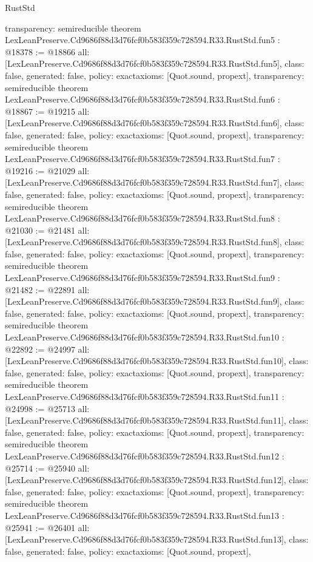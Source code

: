\begin{lexlean}{RustStd}
\begin{coremodule}
{  transparency: semireducible
}
theorem LexLeanPreserve.Cd9686f88d3d76fcf0b583f359c728594.R33.RustStd.fun5 : @18378 := @18866 {
  all: [LexLeanPreserve.Cd9686f88d3d76fcf0b583f359c728594.R33.RustStd.fun5],
  class: false,
  generated: false,
  policy: exact{axioms: [Quot.sound, propext]},
  transparency: semireducible
}
theorem LexLeanPreserve.Cd9686f88d3d76fcf0b583f359c728594.R33.RustStd.fun6 : @18867 := @19215 {
  all: [LexLeanPreserve.Cd9686f88d3d76fcf0b583f359c728594.R33.RustStd.fun6],
  class: false,
  generated: false,
  policy: exact{axioms: [Quot.sound, propext]},
  transparency: semireducible
}
theorem LexLeanPreserve.Cd9686f88d3d76fcf0b583f359c728594.R33.RustStd.fun7 : @19216 := @21029 {
  all: [LexLeanPreserve.Cd9686f88d3d76fcf0b583f359c728594.R33.RustStd.fun7],
  class: false,
  generated: false,
  policy: exact{axioms: [Quot.sound, propext]},
  transparency: semireducible
}
theorem LexLeanPreserve.Cd9686f88d3d76fcf0b583f359c728594.R33.RustStd.fun8 : @21030 := @21481 {
  all: [LexLeanPreserve.Cd9686f88d3d76fcf0b583f359c728594.R33.RustStd.fun8],
  class: false,
  generated: false,
  policy: exact{axioms: [Quot.sound, propext]},
  transparency: semireducible
}
theorem LexLeanPreserve.Cd9686f88d3d76fcf0b583f359c728594.R33.RustStd.fun9 : @21482 := @22891 {
  all: [LexLeanPreserve.Cd9686f88d3d76fcf0b583f359c728594.R33.RustStd.fun9],
  class: false,
  generated: false,
  policy: exact{axioms: [Quot.sound, propext]},
  transparency: semireducible
}
theorem LexLeanPreserve.Cd9686f88d3d76fcf0b583f359c728594.R33.RustStd.fun10 : @22892 := @24997 {
  all: [LexLeanPreserve.Cd9686f88d3d76fcf0b583f359c728594.R33.RustStd.fun10],
  class: false,
  generated: false,
  policy: exact{axioms: [Quot.sound, propext]},
  transparency: semireducible
}
theorem LexLeanPreserve.Cd9686f88d3d76fcf0b583f359c728594.R33.RustStd.fun11 : @24998 := @25713 {
  all: [LexLeanPreserve.Cd9686f88d3d76fcf0b583f359c728594.R33.RustStd.fun11],
  class: false,
  generated: false,
  policy: exact{axioms: [Quot.sound, propext]},
  transparency: semireducible
}
theorem LexLeanPreserve.Cd9686f88d3d76fcf0b583f359c728594.R33.RustStd.fun12 : @25714 := @25940 {
  all: [LexLeanPreserve.Cd9686f88d3d76fcf0b583f359c728594.R33.RustStd.fun12],
  class: false,
  generated: false,
  policy: exact{axioms: [Quot.sound, propext]},
  transparency: semireducible
}
theorem LexLeanPreserve.Cd9686f88d3d76fcf0b583f359c728594.R33.RustStd.fun13 : @25941 := @26401 {
  all: [LexLeanPreserve.Cd9686f88d3d76fcf0b583f359c728594.R33.RustStd.fun13],
  class: false,
  generated: false,
  policy: exact{axioms: [Quot.sound, propext]},
}
\end{coremodule}
\end{lexlean}

